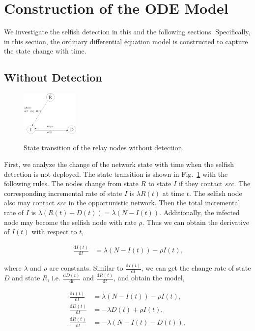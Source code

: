 \section{Construction of the ODE Model}
\label{sec:wo_detect}
We investigate the selfish detection in this and the following sections.
Specifically, in this section, the ordinary differential equation model
is constructed to capture the state change with time.
\subsection{Without Detection}
\begin{figure}
  \centering
  {\includegraphics[width=0.25\textwidth]
  {fig/state_transition_no_detect.eps}}
     \caption{State transition of the relay nodes without detection.}
     \label{fig:ss_wo_dt}
\end{figure}
First, we analyze the change of the network state with time
when the selfish detection is not deployed. 
The state transition is shown
in Fig.~\ref{fig:ss_wo_dt} with the following rules.
The nodes change from state $R$ to state $I$ if they contact $src$.
The corresponding incremental rate of state $I$ is $\lambda R(t)$ at time $t$. 
The selfish node also may contact $src$ in the opportunistic network.
Then the total incremental rate of $I$ is 
$\lambda (R(t)+D(t))=\lambda (N-I(t))$.
Additionally, the infected node may become the selfish node with rate $\rho$.
Thus we can obtain the derivative of $I(t)$ with respect to $t$,
\begin{small}
\begin{equation}
\nonumber
\begin{aligned}
\frac{\mathrm{d} I(t)}{\mathrm{d} t} &= \lambda (N-I(t)) - \rho I(t).
\end{aligned}
\end{equation}
\end{small}
where $\lambda$ and $\rho$ are constants.
Similar to $\frac{\mathrm{d} I(t)}{\mathrm{d} t}$,
we can get the change rate of state $D$ and state $R$,
i.e. $\frac{\mathrm{d} D(t)}{\mathrm{d} t}$ and
$\frac{\mathrm{d} R(t)}{\mathrm{d} t}$,
and obtain the model,
\begin{small}
\begin{equation}
\label{eq:IDR_wo}
\begin{aligned}
\frac{\mathrm{d} I(t)}{\mathrm{d} t} &=  \lambda (N-I(t)) - \rho I(t),\\
\frac{\mathrm{d} D(t)}{\mathrm{d} t} &= - \lambda D(t) + \rho I(t),\\
\frac{\mathrm{d} R(t)}{\mathrm{d} t} &= - \lambda (N-I(t)-D(t)),
\end{aligned}
\end{equation}
\end{small}
